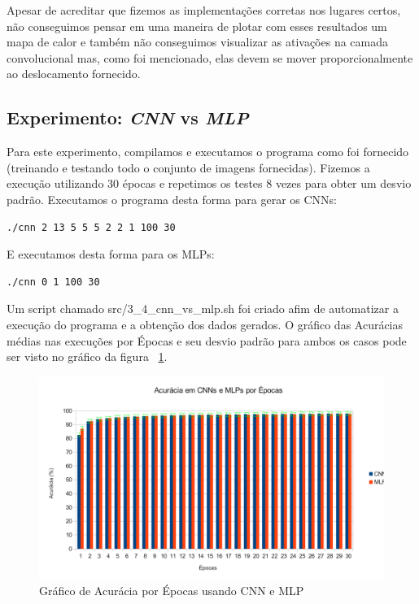 \documentclass[12pt, a4paper, brazil, portuguese]{article}
\begin{document}
Apesar de acreditar que fizemos as implementações corretas nos lugares certos, não conseguimos
pensar em uma maneira de plotar com esses resultados um mapa de calor e também não conseguimos
visualizar as ativações na camada convolucional mas, como foi mencionado, elas devem se mover
proporcionalmente ao deslocamento fornecido.



\subsection{Experimento: \emph{CNN} vs \emph{MLP}}

Para este experimento, compilamos e executamos o programa como foi fornecido (treinando e testando
todo o conjunto de imagens fornecidas). Fizemos a execução utilizando 30 épocas e repetimos os
testes 8 vezes para obter um desvio padrão. Executamos o programa desta forma para gerar os CNNs:

\begin{verbatim}
./cnn 2 13 5 5 5 2 2 1 100 30
\end{verbatim}

E executamos desta forma para os MLPs:

\begin{verbatim}
./cnn 0 1 100 30
\end{verbatim}

Um script chamado src\//3\_4\_cnn\_vs\_mlp.sh foi criado afim de automatizar a execução do programa
e a obtenção dos dados gerados. O gráfico das Acurácias médias nas execuções por Épocas e seu desvio
padrão para ambos os casos pode ser visto no gráfico da figura ~\ref{fig:cnn_mlp}.

\begin{figure}
  \centering
  \includegraphics[width = \textwidth]{gra.pdf}
  \caption{Gráfico de Acurácia por Épocas usando CNN e MLP}
  \label{fig:cnn_mlp}
\end{figure}
\end{document}
